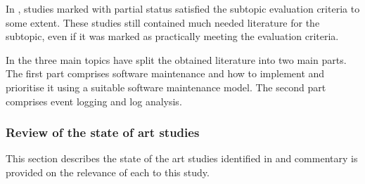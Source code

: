 In , studies marked with partial status satisfied the subtopic evaluation criteria to some extent. These studies still contained much needed literature for the subtopic, even if it was marked as practically meeting the evaluation criteria. \par In  the three main topics have split the obtained literature into two main parts. The first part comprises software maintenance and how to implement and prioritise it using a suitable software maintenance model. The second part comprises event logging and log analysis. 

\clearpage

\subsubsection{Review of the state of art studies}
This section describes the state of the art studies identified in  and commentary is provided on the relevance of each to this study.



\newcommand{\problemStatement}{Software maintenance is a problem in the industry due to how inefficiently developers prioritise maintenance activities. A proven method to monitor software behaviours is event logging. The logging mechanism and log analysis to improve software maintenance need to be explicitly designed for user-based events.}

\clearpage

